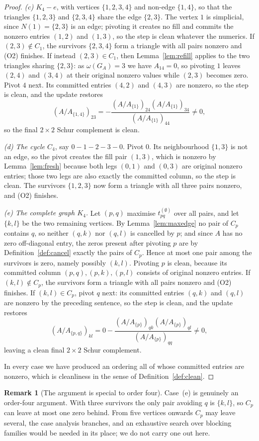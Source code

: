 \documentclass[11pt]{article}
\theoremstyle{plain}
\theoremstyle{definition}
\newtheorem{remark}[theorem]{Remark}
\begin{document}
\begin{humanblock}
\begin{proof}
\emph{(c) $K_4-e$}, with vertices $\{1,2,3,4\}$ and non-edge $\{1,4\}$, so that the triangles
$\{1,2,3\}$ and $\{2,3,4\}$ share the edge $\{2,3\}$. The vertex $1$ is simplicial, since
$N(1)=\{2,3\}$ is an edge; pivoting it creates no fill and commits the nonzero entries $(1,2)$ and
$(1,3)$, so the step is clean whatever the numerics. If $(2,3)\notin C_1$, the survivors $\{2,3,4\}$
form a triangle with all pairs nonzero and (O2) finishes. If instead $(2,3)\in C_1$, then
Lemma~\ref{lem:refill} applies to the two triangles sharing $\{2,3\}$: as $\omega(G_A)=3$ we have
$A_{14}=0$, so pivoting $1$ leaves $(2,4)$ and $(3,4)$ at their original nonzero values while $(2,3)$
becomes zero. Pivot $4$ next. Its committed entries $(4,2)$ and $(4,3)$ are nonzero, so the step is
clean, and the update restores
\[
  (A/A_{\{1,4\}})_{23}=-\frac{(A/A_{\{1\}})_{24}(A/A_{\{1\}})_{34}}{(A/A_{\{1\}})_{44}}\neq0,
\]
so the final $2\times2$ Schur complement is clean.

\emph{(d) The cycle $C_4$}, say $0-1-2-3-0$. Pivot $0$. Its neighbourhood $\{1,3\}$ is not an edge, so
the pivot creates the fill pair $(1,3)$, which is nonzero by Lemma~\ref{lem:fresh} because both legs
$(0,1)$ and $(0,3)$ are original nonzero entries; those two legs are also exactly the committed
column, so the step is clean. The survivors $\{1,2,3\}$ now form a triangle with all three pairs
nonzero, and (O2) finishes.

\emph{(e) The complete graph $K_4$.} Let $(p,q)$ maximise $t^{(\emptyset)}_{pq}$ over all pairs, and
let $\{k,l\}$ be the two remaining vertices. By Lemma~\ref{lem:maxedge} no pair of $C_p$ contains
$q$, so neither $(q,k)$ nor $(q,l)$ is cancelled by $p$; and since $A$ has no zero off-diagonal
entry, the zeros present after pivoting $p$ are by Definition~\ref{def:cancel} exactly the pairs of
$C_p$. Hence at most one pair among the survivors is zero, namely possibly $(k,l)$. Pivoting $p$ is
clean, because its committed column $(p,q),(p,k),(p,l)$ consists of original nonzero entries. If
$(k,l)\notin C_p$, the survivors form a triangle with all pairs nonzero and (O2) finishes. If
$(k,l)\in C_p$, pivot $q$ next: its committed entries $(q,k)$ and $(q,l)$ are nonzero by the
preceding sentence, so the step is clean, and the update restores
\[
  (A/A_{\{p,q\}})_{kl}=0-\frac{(A/A_{\{p\}})_{qk}(A/A_{\{p\}})_{ql}}{(A/A_{\{p\}})_{qq}}\neq0,
\]
leaving a clean final $2\times2$ Schur complement.

In every case we have produced an ordering all of whose committed entries are nonzero, which is
cleanliness in the sense of Definition~\ref{def:clean}.
\end{proof}

\begin{remark}[The argument is special to order four]\label{rem:leq4-sharp}
Case~(e) is genuinely an order-four argument. With three survivors the only pair avoiding $q$ is
$\{k,l\}$, so $C_p$ can leave at most one zero behind. From five vertices onwards $C_p$ may leave
several, the case analysis branches, and an exhaustive search over blocking families would be needed
in its place; we do not carry one out here.
\end{remark}
\end{humanblock}
\end{document}
